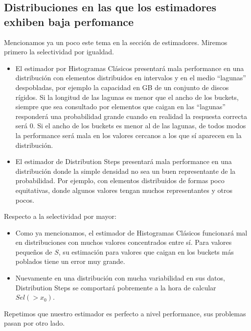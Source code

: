 \subsection{Distribuciones en las que los estimadores exhiben baja perfomance}
Mencionamos ya un poco este tema en la sección de estimadores. Miremos primero la selectividad por igualdad.
\begin{itemize}
 \item El estimador por Histogramas Clásicos presentará mala performance en una distribución con elementos distribuidos en intervalos y en el medio ``lagunas'' despobladas, por ejemplo la capacidad en GB de un conjunto de discos rígidos. Si la longitud de las lagunas es menor que el ancho de los buckets, siempre que sea consultado por elementos que caigan en las ``lagunas'' responderá una probabilidad grande cuando en realidad la respuesta correcta será 0. Si el ancho de los buckets es menor al de las lagunas, de todos modos la performance será mala en los valores cercanos a los que sí aparecen en la distribución.
 \item El estimador de Distribution Steps presentará mala performance en una distribución donde la simple densidad no sea un buen representante de la probabilidad. Por ejemplo, con elementos distribuidos de formas poco equitativas, donde algunos valores tengan muchos representantes y otros pocos.
\end{itemize}
Respecto a la selectividad por mayor:
\begin{itemize}
 \item Como ya mencionamos, el estimador de Histogramas Clásicos funcionará mal en distribuciones con muchos valores concentrados entre sí. Para valores pequeños de $S$, su estimación para valores que caigan en los buckets más poblados tiene un error muy grande.
 \item Nuevamente en una distribución con mucha variabilidad en sus datos, Distribution Steps se comportará pobremente a la hora de calcular $Sel(>x_0)$.
\end{itemize}
Repetimos que nuestro estimador es perfecto a nivel performance, sus problemas pasan por otro lado.